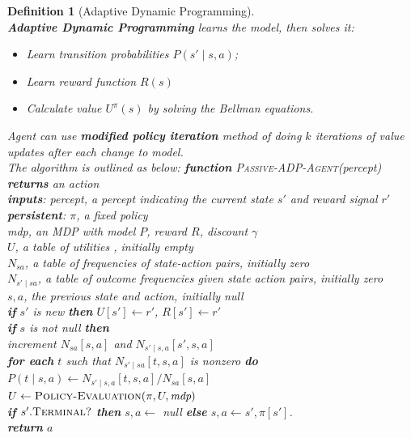 \documentclass[12pt]{article}
\newcommand{\ind}{\hspace*{15pt}}
\newtheorem{definition}{Definition}[section]
\theoremstyle{definition}
\begin{document}
\begin{definition}[Adaptive Dynamic Programming]
\hfill\\\normalfont\textbf{Adaptive Dynamic Programming} learns the model, then solves it:
\begin{itemize}
\item Learn transition probabilities $P(s'\mid s, a)$;
\item Learn reward function $R(s)$
\item Calculate value $U^{\pi}(s)$ by solving the Bellman equations.
\end{itemize}
Agent can use \textbf{modified policy iteration} method of doing $k$ iterations of value updates after each change to model.\\
The algorithm is outlined as below:
\textbf{function} \textsc{Passive-ADP-Agent}(\textit{percept}) \textbf{returns} an action\\
\ind \textbf{inputs}: \textit{percept}, a percept indicating the current state $s'$ and reward signal $r'$\\
\ind \textbf{persistent}: $\pi$, a fixed policy\\
\ind \ind \ind \ind \textit{mdp}, an MDP with model $P$, reward $R$, discount $\gamma$\\
\ind \ind \ind \ind $U$, a table of utilities , initially empty\\
\ind \ind \ind \ind $N_{sa}$, a table of frequencies of state-action pairs, initially zero\\
\ind \ind \ind \ind $N_{s'\mid sa}$, a table of outcome frequencies given state action pairs, initially zero\\
\ind \ind \ind \ind $s,a$, the previous state and action, initially null\\
\ind \textbf{if} $s'$ is new \textbf{then} $U[s']\leftarrow r'$, $R[s']\leftarrow r'$\\
\ind \textbf{if} $s$ is not null \textbf{then}\\
\ind \ind increment $N_{sa}[s,a]$ and $N_{s'\mid s,a}[s', s, a]$\\
\ind \ind \textbf{for each} $t$ such that $N_{s'\mid sa}[t,s,a]$ is nonzero \textbf{do}\\
\ind \ind \ind $P(t\mid s,a)\leftarrow N_{s'\mid s,a}[t,s,a]/N_{sa}[s,a]$\\
\ind $U\leftarrow \textsc{Policy-Evaluation}(\pi, U, \textit{mdp})$\\
\ind \textbf{if} $s'.\textsc{Terminal?}$ \textbf{then} $s,a\leftarrow$ null \textbf{else} $s,a\leftarrow s', \pi[s']$.\\
\ind \textbf{return} $a$
\end{definition}
\end{document}
